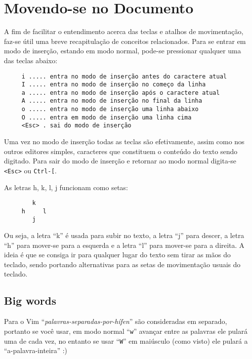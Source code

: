 
\chapter{Movendo-se no Documento}\label{cha:Movendo-se no Documento}

A fim de facilitar o entendimento acerca das teclas e atalhos de movimentação,
faz-se útil uma breve recapitulação de conceitos relacionados. Para se entrar
em modo de inserção, estando em modo normal, pode-se pressionar qualquer uma
das teclas abaixo:

\begin{verbatim}
     i ..... entra no modo de inserção antes do caractere atual
     I ..... entra no modo de inserção no começo da linha
     a ..... entra no modo de inserção após o caractere atual
     A ..... entra no modo de inserção no final da linha
     o ..... entra no modo de inserção uma linha abaixo
     O ..... entra em modo de inserção uma linha cima
     <Esc> . sai do modo de inserção
\end{verbatim}

Uma vez no modo de inserção todas as teclas são efetivamente, assim como nos
outros editores simples, caracteres que constituem o conteúdo do texto sendo
digitado.  Para sair do modo de inserção e retornar ao modo normal digita-se
\verb+<Esc>+ ou \verb+Ctrl-[+.

As letras h, k, l, j funcionam como setas:

\begin{verbatim}
        k
     h     l
        j
\end{verbatim}

Ou seja, a letra ``k'' é usada para subir no texto, a letra ``j'' para descer,
a letra ``h'' para mover-se para a esquerda e a letra ``l'' para mover-se para
a direita. A ideia é que se consiga ir para qualquer lugar do texto sem tirar
as mãos do teclado, sendo portando alternativas para as setas de movimentação
usuais do teclado.

\section{Big words}
\label{Big words}

Para o Vim ``{\em{palavras-separadas-por-hífen}}'' são consideradas em separado, portanto se você usar,
em modo normal ``\verb+w+'' avançar entre as palavras ele pulará uma de
cada vez, no entanto se usar ``\verb+W+''
em maiúsculo (como visto) ele pulará a ``a-palavra-inteira'' :)

